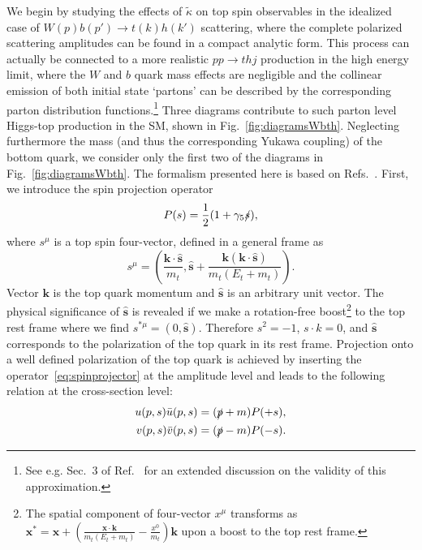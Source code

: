 \documentclass[11pt,a4paper]{article}
\newcommand{\hvec}[1]{\bm{\hat #1}}
\begin{document}
We begin by studying the effects of $\tilde \kappa$ on top spin
observables in the idealized case of $W (p) b (p') \to t (k) h (k')$
scattering, where the complete polarized scattering amplitudes can be
found in a compact analytic form.  This process can actually be
connected to a more realistic $pp \to t h j$ production in the high
energy limit, where the $W$ and $b$ quark mass effects are negligible
and the collinear emission of both initial state `partons' can be
described by the corresponding parton distribution functions.\footnote{See e.g. Sec.~3 of Ref.~\cite{Mangano:2016jyj} for an extended discussion on the validity of this approximation.}  Three
diagrams contribute to such parton level Higgs-top production in the
SM, shown in Fig.~\ref{fig:diagramsWbth}. Neglecting furthermore the
mass (and thus the corresponding Yukawa coupling) of the bottom quark,
we consider only the first two of the diagrams in
Fig.~\ref{fig:diagramsWbth}. The formalism presented here is based on
Refs.~\cite{Dicus:1984fu,hep-ph/0403035,Fajfer:2012si}. First, we
introduce the spin projection operator
\begin{equation}
\label{eq:spinprojector}
P(s) = \frac{1}{2} (1 + \gamma_5 \slashed{s}),
\end{equation}
where $s^\mu$ is a top spin four-vector, defined in a general frame as
\begin{equation}
\label{eq:spinFV}
s^\mu = \left(\frac{\bm{k}\cdot \hvec{s}}{m_t}, \hvec{s} + \frac{\bm{k} (\bm{k} \cdot \hvec{s})}{m_t (E_t + m_t)}\right).
\end{equation}
Vector $\bm{k}$ is the top quark momentum and $\hvec{s}$ is an
arbitrary unit vector. The physical significance of $\hvec{s}$ is
revealed if we make a rotation-free boost\footnote{The spatial component of four-vector $x^\mu$ transforms as $\bm{x}^* = \bm{x} + \left(\frac{\bm{x}\cdot \bm{k}}{m_t (E_t+m_t)}-\frac{x^0}{m_t} \right) \bm{k}$ upon a boost to the top rest frame.} to the top rest
frame where we find $s^{*\mu} = (0,\hvec{s})$. Therefore $s^2 = -1$,
$s \cdot k =0$, and $\hvec{s}$ corresponds to the polarization of the top quark in its rest frame. Projection onto a well
defined polarization of the top quark is achieved by inserting the
operator~\eqref{eq:spinprojector} at the amplitude level and
leads to the following relation at the cross-section level:
\begin{equation}
\label{eq:projections}
\begin{split}
u(p,s) \bar{u} (p,s) &= (\slashed{p}+m) P(+s), \\
v(p,s) \bar{v} (p,s) &= (\slashed{p}-m) P(-s).
\end{split}
\end{equation}
\end{document}
